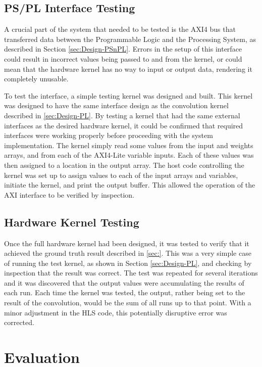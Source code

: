 \documentclass[12pt]{article}
\begin{document}
\subsection{PS/PL Interface Testing}
\label{sec:Test-AXI}

A crucial part of the system that needed to be tested is the AXI4 bus that transferred data between the Programmable Logic and the Processing System, as described in Section \ref{sec:Design-PSnPL}. Errors in the setup of this interface could result in incorrect values being passed to and from the kernel, or could mean that the hardware kernel has no way to input or output data, rendering it completely unusable.

To test the interface, a simple testing kernel was designed and built. This kernel was designed to have the same interface design as the convolution kernel described in \ref{sec:Design-PL}. By testing a kernel that had the same external interfaces as the desired hardware kernel, it could be confirmed that required interfaces were working properly before proceeding with the system implementation. The kernel simply read some values from the input and weights arrays, and from each of the AXI4-Lite variable inputs. Each of these values was then assigned to a location in the output array. The host code controlling the kernel was set up to assign values to each of the input arrays and variables, initiate the kernel, and print the output buffer. This allowed the operation of the AXI interface to be verified by inspection.

\subsection{Hardware Kernel Testing}
\label{sec:Test-HW}

Once the full hardware kernel had been designed, it was tested to verify that it achieved the ground truth result described in \ref{sec:}. This was a very simple case of running the test kernel, as shown in Section \ref{sec:Design-PL}, and checking by inspection that the result was correct. The test was repeated for several iterations and it was discovered that the output values were accumulating the results of each run. Each time the kernel was tested, the output, rather being set to the result of the convolution, would be the sum of all runs up to that point. With a minor adjustment in the HLS code, this potentially disruptive error was corrected.

\newpage

\section{Evaluation}
\label{sec:Eval}
\end{document}
